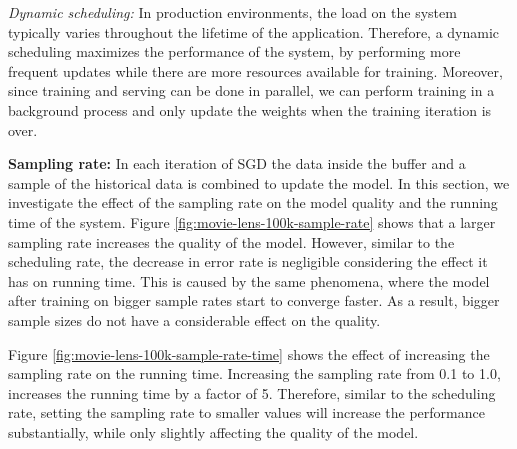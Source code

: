 \documentclass[10pt,conference,letterpaper]{IEEEtran}
\begin{document}
\textit{Dynamic scheduling:} In production environments, the load on the system typically varies throughout the lifetime of the application.
Therefore, a dynamic scheduling maximizes the performance of the system, by performing more frequent updates while there are more resources available for training. 
Moreover, since training and serving can be done in parallel, we can perform training in a background process and only update the weights when the training iteration is over. 

\textbf{Sampling rate:} 
In each iteration of SGD the data inside the buffer and a sample of the historical data is combined to update the model.
In this section, we investigate the effect of the sampling rate on the model quality and the running time of the system.
Figure \ref{fig:movie-lens-100k-sample-rate} shows that a larger sampling rate increases the quality of the model.
However, similar to the scheduling rate, the decrease in error rate is negligible considering the effect it has on running time. 
This is caused by the same phenomena, where the model after training on bigger sample rates start to converge faster.
As a result, bigger sample sizes do not have a considerable effect on the quality.
 
Figure \ref{fig:movie-lens-100k-sample-rate-time} shows the effect of increasing the sampling rate on the running time.
Increasing the sampling rate from 0.1 to 1.0, increases the running time by a factor of 5.
Therefore, similar to the scheduling rate, setting the sampling rate to smaller values will increase the performance substantially, while only slightly affecting the quality of the model.
\end{document}
